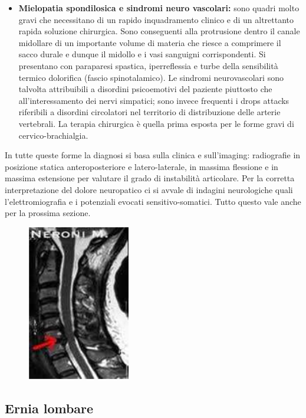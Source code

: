 \begin{itemize}
\item
  \textbf{Mielopatia spondilosica e sindromi neuro vascolari:} sono quadri molto gravi che necessitano di un rapido inquadramento clinico e di un altrettanto rapida soluzione chirurgica. Sono conseguenti alla protrusione dentro il canale midollare di un importante volume di materia che riesce a comprimere il sacco durale e dunque il midollo e i vasi sanguigni corrispondenti. Si presentano con paraparesi spastica, iperreflessia e turbe della sensibilità termico dolorifica (fascio spinotalamico). Le sindromi neurovascolari sono talvolta attribuibili a disordini psicoemotivi del paziente piuttosto che all'interessamento dei nervi simpatici; sono invece frequenti i drops attacks riferibili a disordini circolatori nel territorio di distribuzione delle arterie vertebrali. La terapia chirurgica è quella prima esposta per le forme gravi di cervico-brachialgia.
\end{itemize}

In tutte queste forme la diagnosi si basa sulla clinica e sull'imaging:
radiografie in posizione statica anteroposteriore e latero-laterale, in
massima flessione e in massima estensione per valutare il grado di
instabilità articolare. Per la corretta interpretazione del dolore
neuropatico ci si avvale di indagini neurologiche quali
l'elettromiografia e i potenziali evocati sensitivo-somatici. Tutto
questo vale anche per la prossima sezione.

\begin{figure}[!ht]
\centering
\includegraphics[width=0.4\textwidth]{020/image5.png}
\end{figure}

\subsection{Ernia lombare}

